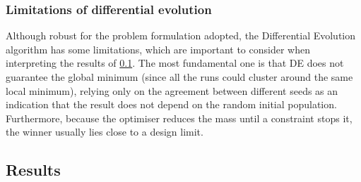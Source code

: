\subsubsection{Limitations of differential evolution}\label{sec:de_limitations}
Although robust for the problem formulation adopted, the Differential Evolution algorithm has some limitations, which are important to consider when interpreting the results of \cref{sec:step4-optimisation-wrapper_results}. The most fundamental one is that DE does not guarantee the global minimum (since all the runs could cluster around the same local minimum), relying only on the agreement between different seeds as an indication that the result does not depend on the random initial population. Furthermore, because the optimiser reduces the mass until a constraint stops it, the winner usually lies close to a design limit.


\subsection{Results}\label{sec:step4-optimisation-wrapper_results}

